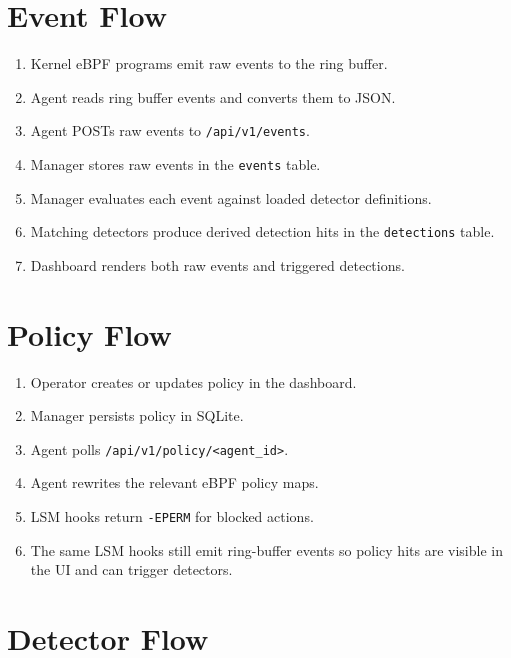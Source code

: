 \documentclass[
  12pt,
]{report}
\providecommand{\tightlist}{%
  \setlength{\itemsep}{0pt}\setlength{\parskip}{0pt}}
\begin{document}
\section{Event Flow}\label{event-flow}

\begin{enumerate}
\def\labelenumi{\arabic{enumi}.}
\tightlist
\item
  Kernel eBPF programs emit raw events to the ring buffer.
\item
  Agent reads ring buffer events and converts them to JSON.
\item
  Agent POSTs raw events to \texttt{/api/v1/events}.
\item
  Manager stores raw events in the \texttt{events} table.
\item
  Manager evaluates each event against loaded detector definitions.
\item
  Matching detectors produce derived detection hits in the
  \texttt{detections} table.
\item
  Dashboard renders both raw events and triggered detections.
\end{enumerate}

\section{Policy Flow}\label{policy-flow}

\begin{enumerate}
\def\labelenumi{\arabic{enumi}.}
\tightlist
\item
  Operator creates or updates policy in the dashboard.
\item
  Manager persists policy in SQLite.
\item
  Agent polls
  \texttt{/api/v1/policy/\textless{}agent\_id\textgreater{}}.
\item
  Agent rewrites the relevant eBPF policy maps.
\item
  LSM hooks return \texttt{-EPERM} for blocked actions.
\item
  The same LSM hooks still emit ring-buffer events so policy hits are
  visible in the UI and can trigger detectors.
\end{enumerate}

\section{Detector Flow}\label{detector-flow}
\end{document}
